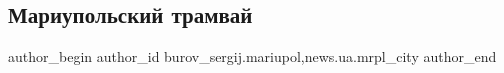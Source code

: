  
 
 
 
 
 
\subsection{Мариупольский трамвай}
\label{sec:05_05_2018.stz.news.ua.mrpl_city.1.mariupolskij_tramvaj}
 
\ifcmt
 author_begin
   author_id burov_sergij.mariupol,news.ua.mrpl_city
 author_end
\fi
